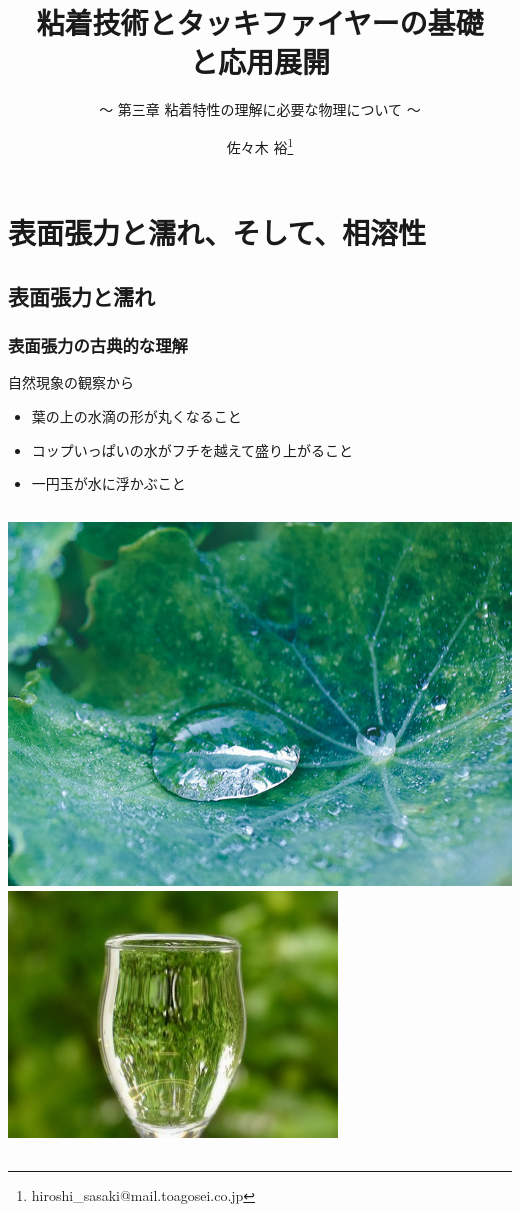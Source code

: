 \documentclass[12pt, dvipdfmx]{beamer}
\title{粘着技術とタッキファイヤーの基礎\\と応用展開}
\subtitle{ ～ 第三章 粘着特性の理解に必要な物理について ～}
\author[東亞合成 佐々木]{佐々木 裕\thanks{hiroshi\_sasaki@mail.toagosei.co.jp}}
\institute[東亞合成]{東亞合成株式会社}
\date{}
\begin{document}
\maketitle

\begin{frame} 
    \tableofcontents[]
\end{frame} 

\section{表面張力と濡れ、そして、相溶性}

\subsection{表面張力と濡れ}
\begin{frame}
	\frametitle{表面張力の古典的な理解}
	\begin{block}{自然現象の観察から}
		\begin{itemize}
			\item 葉の上の水滴の形が丸くなること
			\item コップいっぱいの水がフチを越えて盛り上がること
			\item 一円玉が水に浮かぶこと
		\end{itemize}
		\begin{columns}[c, onlytextwidth]
			\centering
			\includegraphics[width=.6\textwidth]{waterdrop.png}
			\centering
			\includegraphics[width=.6\textwidth]{hyoumen_cup.jpg}

\end{columns}
\end{block}
\end{frame}
\end{document}
